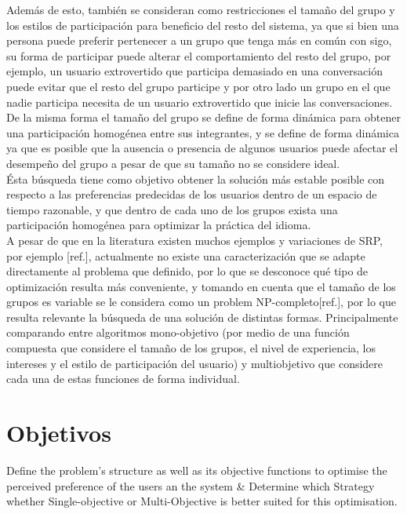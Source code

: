 Además de esto, también se consideran como restricciones el tamaño del grupo y los estilos de participación para beneficio del resto del sistema, ya que si bien una persona puede preferir pertenecer a un grupo que tenga más en común con sigo, su forma de participar puede alterar el comportamiento del resto del grupo, por ejemplo, un usuario extrovertido que participa demasiado en una conversación puede evitar que el resto del grupo participe y por otro lado un grupo en el que nadie participa necesita de un usuario extrovertido que inicie las conversaciones.\\ 

De la misma forma el tamaño del grupo se define de forma dinámica para obtener una participación homogénea entre sus integrantes, y se define de forma dinámica ya que es posible que la ausencia o presencia de algunos usuarios puede afectar el desempeño del grupo a pesar de que su tamaño no se considere ideal.\\

Ésta búsqueda tiene como objetivo obtener la solución más estable posible con respecto a las preferencias predecidas de los usuarios dentro de un espacio de tiempo razonable, y que dentro de cada uno de los grupos exista una participación homogénea para optimizar la práctica del idioma.\\

A pesar de que en la literatura existen muchos ejemplos y variaciones de SRP, por ejemplo [ref.], actualmente no existe una caracterización que se adapte directamente al problema que definido, por lo que se desconoce qué tipo de optimización resulta más conveniente, y tomando en cuenta que el tamaño de los grupos es variable se le considera como un problem NP-completo[ref.], por lo que resulta relevante la búsqueda de una solución de distintas formas. Principalmente comparando entre algoritmos mono-objetivo (por medio de una función compuesta que considere el tamaño de los grupos, el nivel de experiencia, los intereses y el estilo de participación del usuario) y multiobjetivo que considere cada una de estas funciones de forma individual.

\section{Objetivos}

Define the problem's structure as well as its objective functions to optimise the perceived preference of the users an the system & Determine which Strategy whether Single-objective or Multi-Objective is better suited for this optimisation.\\

